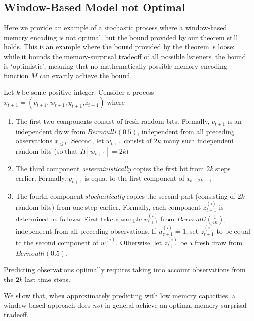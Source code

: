 \documentclass[11pt,letterpaper]{article}
\newcounter{theorem}
\begin{document}
\subsection{Window-Based Model not Optimal}

Here we provide an example of a stochastic process where a window-based memory encoding is not optimal, but the bound provided by our theorem still holds.
This is an example where the bound provided by the theorem is loose: while it bounds the memory-surprisal tradeoff of all possible listeners, the bound is `optimistic', meaning that no mathematically possible memory encoding function $M$ can exactly achieve the bound.

Let $k$ be some positive integer.
Consider a process
$x_{t+1} = (v_{t+1}, w_{t+1}, y_{t+1}, z_{t+1})$
where
\begin{enumerate}
	\item The first two components consist of fresh random bits. Formally, $v_{t+1}$ is an independent draw from $Bernoulli(0.5)$, independent from all preceding observations $x_{\leq t}$.
		Second, let $w_{t+1}$ consist of $2k$ many such independent random bits (so that $H[w_{t+1}] = 2k$)
	\item The third component \emph{deterministically} copies the first bit from $2k$ steps earlier. Formally, $y_{t+1}$ is equal to the first component of $x_{t-2k+1}$
	\item The fourth component \emph{stochastically} copies the second part (consisting of $2k$ random bits) from one step earlier. Formally, each component $z_{t+1}^{(i)}$ is determined as follows: First take a sample $u_{t+1}^{(i)}$ from $Bernoulli(\frac{1}{4k})$, independent from all preceding observations.
		If $u_{z+1}^{(i)}=1$, set $z_{t+1}^{(i)}$ to be equal to the second component of $w_{t}^{(i)}$.
		Otherwise, let $z_{t+1}^{(i)}$ be a fresh draw from $Bernoulli(0.5)$.
\end{enumerate}

Predicting observations optimally requires taking into account observations from the $2k$ last time steps.

We show that, when approximately predicting with low memory capacities, a window-based approach does \emph{not} in general achieve an optimal memory-surprisal tradeoff.
\end{document}
